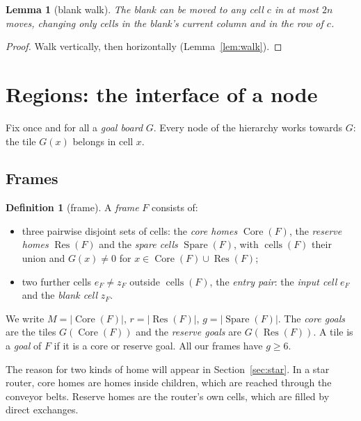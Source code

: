 \documentclass[11pt]{amsart}
\newtheorem{lemma}[theorem]{Lemma}
\theoremstyle{definition}
\newtheorem{definition}[theorem]{Definition}
\newcommand{\cells}{\operatorname{cells}}
\newcommand{\Core}{\operatorname{Core}}
\newcommand{\Res}{\operatorname{Res}}
\newcommand{\Spare}{\operatorname{Spare}}
\begin{document}
\begin{lemma}[blank walk]\label{lem:elbow}
The blank can be moved to any cell $c$ in at most $2n$ moves, changing only cells in
the blank's current column and in the row of $c$.
\end{lemma}

\begin{proof}
Walk vertically, then horizontally (Lemma~\ref{lem:walk}).
\end{proof}

\section{Regions: the interface of a node}\label{sec:regions}

Fix once and for all a \emph{goal board} $G$. Every node of the hierarchy works
towards $G$: the tile $G(x)$ belongs in cell $x$.

\subsection{Frames}
\begin{definition}[frame]\label{def:frame}
A \emph{frame} $F$ consists of:
\begin{itemize}[nosep]
\item three pairwise disjoint sets of cells: the \emph{core homes} $\Core(F)$, the \emph{reserve homes}
  $\Res(F)$ and the \emph{spare cells} $\Spare(F)$, with $\cells(F)$ their union and
  $G(x)\neq0$ for $x\in\Core(F)\cup\Res(F)$;
\item two further cells $e_F\neq z_F$ outside $\cells(F)$, the \emph{entry pair}: the \emph{input cell} $e_F$ and the
  \emph{blank cell} $z_F$.
\end{itemize}
We write $M=|\Core(F)|$, $r=|\Res(F)|$, $g=|\Spare(F)|$. The \emph{core goals}
are the tiles $G(\Core(F))$ and the \emph{reserve goals} are $G(\Res(F))$. A tile is a
\emph{goal} of $F$ if it is a core or reserve goal. All our frames have $g\ge6$.
\end{definition}

The reason for two kinds of home will appear in Section~\ref{sec:star}. In a star router, core homes are
homes inside children, which are reached through the conveyor belts. Reserve homes are the router's own
cells, which are filled by direct exchanges.
\end{document}
